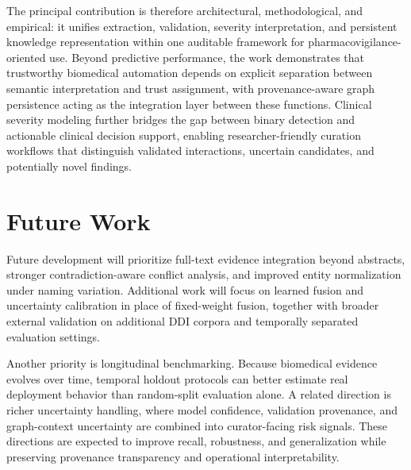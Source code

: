 \documentclass[conference]{Template/IEEEtran}
\begin{document}
The principal contribution is therefore architectural, methodological, and empirical: it unifies extraction, validation, severity interpretation, and persistent knowledge representation within one auditable framework for pharmacovigilance-oriented use. Beyond predictive performance, the work demonstrates that trustworthy biomedical automation depends on explicit separation between semantic interpretation and trust assignment, with provenance-aware graph persistence acting as the integration layer between these functions. Clinical severity modeling further bridges the gap between binary detection and actionable clinical decision support, enabling researcher-friendly curation workflows that distinguish validated interactions, uncertain candidates, and potentially novel findings.

\section{Future Work}
Future development will prioritize full-text evidence integration beyond abstracts, stronger contradiction-aware conflict analysis, and improved entity normalization under naming variation. Additional work will focus on learned fusion and uncertainty calibration in place of fixed-weight fusion, together with broader external validation on additional DDI corpora and temporally separated evaluation settings.

Another priority is longitudinal benchmarking. Because biomedical evidence evolves over time, temporal holdout protocols can better estimate real deployment behavior than random-split evaluation alone. A related direction is richer uncertainty handling, where model confidence, validation provenance, and graph-context uncertainty are combined into curator-facing risk signals. These directions are expected to improve recall, robustness, and generalization while preserving provenance transparency and operational interpretability.
\end{document}
